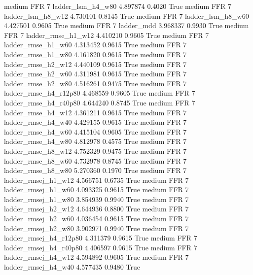     medium      FFR                 7      ladder_lsm_h4_w80   4.897874      0.4020    True
    medium      FFR                 7      ladder_lsm_h8_w12   4.730101      0.8145    True
    medium      FFR                 7      ladder_lsm_h8_w60   4.427501      0.9605    True
    medium      FFR                 7             ladder_mdd   3.968337      0.9930    True
    medium      FFR                 7     ladder_rmse_h1_w12   4.410210      0.9605    True
    medium      FFR                 7     ladder_rmse_h1_w60   4.313452      0.9615    True
    medium      FFR                 7     ladder_rmse_h1_w80   4.161820      0.9615    True
    medium      FFR                 7     ladder_rmse_h2_w12   4.440109      0.9615    True
    medium      FFR                 7     ladder_rmse_h2_w60   4.311981      0.9615    True
    medium      FFR                 7     ladder_rmse_h2_w80   4.516261      0.9475    True
    medium      FFR                 7  ladder_rmse_h4_r12p80   4.468559      0.9605    True
    medium      FFR                 7  ladder_rmse_h4_r40p80   4.644240      0.8745    True
    medium      FFR                 7     ladder_rmse_h4_w12   4.361211      0.9615    True
    medium      FFR                 7     ladder_rmse_h4_w40   4.429155      0.9615    True
    medium      FFR                 7     ladder_rmse_h4_w60   4.415104      0.9605    True
    medium      FFR                 7     ladder_rmse_h4_w80   4.812978      0.4575    True
    medium      FFR                 7     ladder_rmse_h8_w12   4.752329      0.9475    True
    medium      FFR                 7     ladder_rmse_h8_w60   4.732978      0.8745    True
    medium      FFR                 7     ladder_rmse_h8_w80   5.270360      0.1970    True
    medium      FFR                 7    ladder_rmsej_h1_w12   4.566751      0.6735    True
    medium      FFR                 7    ladder_rmsej_h1_w60   4.093325      0.9615    True
    medium      FFR                 7    ladder_rmsej_h1_w80   3.854939      0.9940    True
    medium      FFR                 7    ladder_rmsej_h2_w12   4.644936      0.8800    True
    medium      FFR                 7    ladder_rmsej_h2_w60   4.036454      0.9615    True
    medium      FFR                 7    ladder_rmsej_h2_w80   3.902971      0.9940    True
    medium      FFR                 7 ladder_rmsej_h4_r12p80   4.311379      0.9615    True
    medium      FFR                 7 ladder_rmsej_h4_r40p80   4.406597      0.9615    True
    medium      FFR                 7    ladder_rmsej_h4_w12   4.594892      0.9605    True
    medium      FFR                 7    ladder_rmsej_h4_w40   4.577435      0.9480    True
